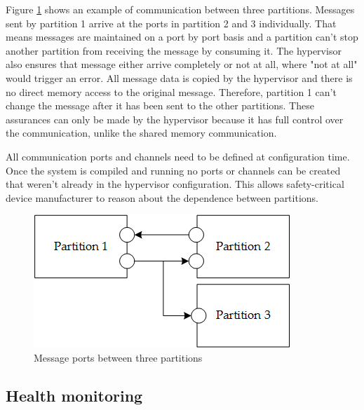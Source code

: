 Figure \ref{fig:message_ports} shows an example of communication between three partitions. 
Messages sent by partition 1 arrive at the ports in partition 2 and 3 individually. That means messages are maintained on a port by port basis and a partition can't stop another partition from receiving the message by consuming it. The hypervisor also ensures that message either arrive completely or not at all, where "not at all" would trigger an error. All message data is copied by the hypervisor and there is no direct memory access to the original message. Therefore, partition 1 can't change the message after it has been sent to the other partitions. These assurances can only be made by the hypervisor because it has full control over the communication, unlike the shared memory communication.

All communication ports and channels need to be defined at configuration time. Once the system is compiled and running no ports or channels can be created that weren't already in the hypervisor configuration. This allows safety-critical device manufacturer to reason about the dependence between partitions.
\begin{figure}[hb!]
\centering
\includegraphics[scale=0.50]{Figures/message_ports.png}
\decoRule
\caption{Message ports between three partitions}
\label{fig:message_ports}
\end{figure}

\subsection{Health monitoring}

